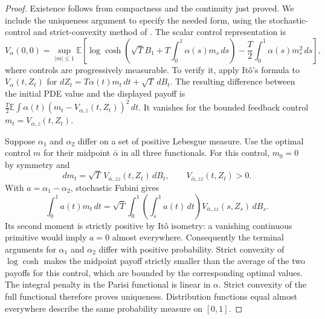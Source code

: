 \begin{proof}
Existence follows from compactness and the continuity just proved.
We include the uniqueness argument to specify the needed form, using
the stochastic-control and strict-convexity method of
\cite[Theorems~2--3]{AuffingerChenUniqueness2015}.
The scalar control representation is
\[
 V_\alpha(0,0)=\sup_{|m|\le1}
 \mathbb E\left[
  \log\cosh\left(\sqrt T B_1+T\int_0^1\alpha(s)m_s\,ds\right)
    -\frac T2\int_0^1\alpha(s)m_s^2\,ds\right],
\]
where controls are progressively measurable. To verify it, apply
It\^o's formula to $V_\alpha(t,Z_t)$ for
$dZ_t=T\alpha(t)m_t\,dt+\sqrt T\,dB_t$. The resulting difference
between the initial PDE value and the displayed payoff is
$\frac T2\mathbb E\int\alpha(t)(m_t-V_{\alpha,z}(t,Z_t))^2\,dt$.
It vanishes for the bounded feedback control
$m_t=V_{\alpha,z}(t,Z_t)$.

Suppose $\alpha_1$ and $\alpha_2$ differ on a set of positive
Lebesgue measure. Use the optimal control $m$ for their midpoint
$\bar\alpha$ in all three functionals. For this control,
$m_0=0$ by symmetry and
\[
 dm_t=\sqrt T\,V_{\bar\alpha,zz}(t,Z_t)\,dB_t,
 \qquad V_{\bar\alpha,zz}(t,Z_t)>0.
\]
With $a=\alpha_1-\alpha_2$, stochastic Fubini gives
\[
 \int_0^1a(t)m_t\,dt
 =\sqrt T\int_0^1
       \left(\int_s^1a(t)\,dt\right)
                    V_{\bar\alpha,zz}(s,Z_s)\,dB_s.
\]
Its second moment is strictly positive by It\^o isometry: a
vanishing continuous primitive would imply $a=0$ almost everywhere.
Consequently the terminal arguments for $\alpha_1$ and $\alpha_2$
differ with positive probability. Strict convexity of
$\log\cosh$ makes the midpoint payoff strictly smaller than the
average of the two payoffs for this control, which are bounded by
the corresponding optimal values. The integral penalty in the
Parisi functional is linear in $\alpha$. Strict convexity of the full
functional therefore proves uniqueness. Distribution functions equal almost
everywhere describe the same probability measure on $[0,1]$.


\end{proof}
